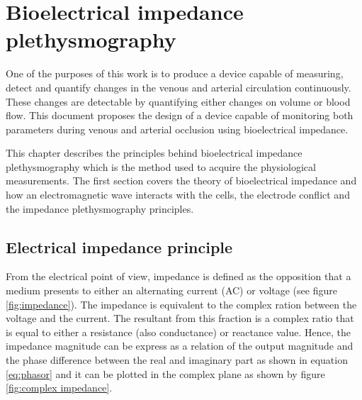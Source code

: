 
\chapter{Bioelectrical impedance plethysmography}  %
\label{chapter impedance}

\ifpdf
    \graphicspath{{Chapter3/Figs/Raster/}{Chapter3/Figs/PDF/}{Chapter3/Figs/}}
\else
    \graphicspath{{Chapter3/Figs/Vector/}{Chapter3/Figs/}}
\fi

One of the purposes of this work is to produce a device capable of measuring, detect and quantify changes in the venous and arterial circulation continuously. These changes are detectable by quantifying either changes on volume or blood flow. This document proposes the design of a device capable of monitoring both parameters during venous and arterial occlusion using bioelectrical impedance. 

This chapter describes the principles behind bioelectrical impedance plethysmography which is the method used to acquire the physiological measurements. The first section covers the theory of bioelectrical impedance and how an electromagnetic wave interacts with the cells, the electrode conflict and the impedance plethysmography principles. 

\section{Electrical impedance principle}
\label{section impedance 1}
From the electrical point of view, impedance is defined as the opposition that a medium presents to either an alternating current (AC) or voltage (see figure \ref{fig:impedance}). The impedance is equivalent to the complex ration between the voltage and the current.  The resultant from this fraction is a complex ratio that is equal to either a resistance (also conductance) or reactance value. Hence, the impedance magnitude can be express as a relation of the output magnitude and the phase difference between the real and imaginary part as shown in equation \ref{eq:phasor} and it can be plotted in the complex plane as shown by figure \ref{fig:complex impedance}.

